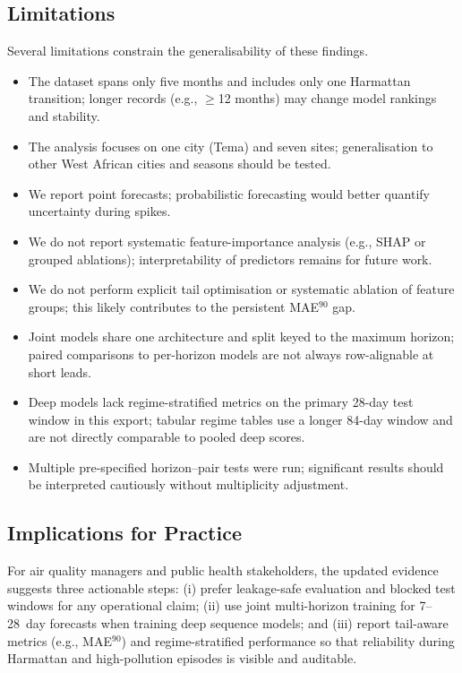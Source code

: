\documentclass[a4paper,fleqn]{cas-sc}
\begin{document}
\subsection{Limitations}

Several limitations constrain the generalisability of these findings.
\begin{itemize}
    \item The dataset spans only five months and includes only one Harmattan transition; longer records (e.g., $\geq$12 months) may change model rankings and stability.
    \item The analysis focuses on one city (Tema) and seven sites; generalisation to other West African cities and seasons should be tested.
    \item We report point forecasts; probabilistic forecasting would better quantify uncertainty during spikes.
    \item We do not report systematic feature-importance analysis (e.g., SHAP or grouped ablations); interpretability of predictors remains for future work.
    \item We do not perform explicit tail optimisation or systematic ablation of feature groups; this likely contributes to the persistent MAE$^{90}$ gap.
    \item Joint models share one architecture and split keyed to the maximum horizon; paired comparisons to per-horizon models are not always row-alignable at short leads.
    \item Deep models lack regime-stratified metrics on the primary 28-day test window in this export; tabular regime tables use a longer 84-day window and are not directly comparable to pooled deep scores.
    \item Multiple pre-specified horizon--pair tests were run; significant results should be interpreted cautiously without multiplicity adjustment.
\end{itemize}

\subsection{Implications for Practice}

For air quality managers and public health stakeholders, the updated evidence suggests three actionable steps: (i) prefer leakage-safe evaluation and blocked test windows for any operational claim; (ii) use joint multi-horizon training for 7--28~day forecasts when training deep sequence models; and (iii) report tail-aware metrics (e.g., MAE$^{90}$) and regime-stratified performance so that reliability during Harmattan and high-pollution episodes is visible and auditable.
\end{document}
